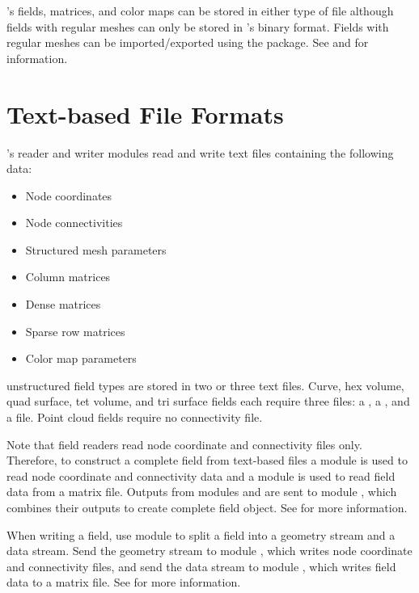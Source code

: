 \sr{}'s fields, matrices, and color maps can be stored in either type
of file although fields with regular meshes can only be stored in
\sr{}'s binary format.  Fields with regular meshes can be
imported/exported using the  package.  See
 and
for information.

\section{Text-based File Formats}

\sr{}'s reader and writer modules read and write text files containing the
following data:

\begin{itemize}
\item Node coordinates
\item Node connectivities
\item Structured mesh parameters
\item Column matrices
\item Dense matrices
\item Sparse row matrices
\item Color map parameters
\end{itemize}

\sr{} unstructured field  types are stored in two or three text files.
Curve, hex volume, quad surface, tet volume, and tri surface fields
each require three files: a , a
, and a  file.  Point cloud fields require no
connectivity file.  

Note that field readers read node coordinate and connectivity files
only.  Therefore, to construct a complete field from text-based files
a  module is used to read node coordinate and
connectivity data and a  module is used to read
field data from a matrix file.  Outputs from modules
 and  are sent to module
, which combines their outputs to create
complete field object.  See 
for more information.

When writing a field, use module  to split a
field into a geometry stream and a data stream.  Send the geometry
stream to module , which writes node coordinate
and connectivity files, and send the data stream to module
, which writes field data to a matrix file.  See
 for more information.

